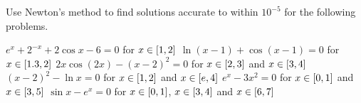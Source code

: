 \documentclass[../../../../Assignments]{subfiles}
\begin{document}
\begin{exercise}\label{exer:2.3.6}
    Use Newton's method to find solutions accurate to within \(10^{-5}\) for the
    following problems.

    \begin{tasks}
        \task \(e^x + 2^{-x} + 2 \cos{x} - 6 = 0\) for \(x \in \interval{1}{2}\)
        \task \(\ln(x - 1) + \cos(x - 1) = 0\) for \(x \in
            \interval{\num{1.3}}{2}\)
        \task \(2 x \cos(2x) - (x - 2)^2 = 0\) for \(x \in \interval{2}{3}\) and
            \(x \in \interval{3}{4}\)
        \task \((x - 2)^2 - \ln{x} = 0\) for \(x \in \interval{1}{2}\) and \(x
            \in \interval{e}{4}\)
        \task \(e^x - 3x^2 = 0\) for \(x \in \interval{0}{1}\) and \(x \in
            \interval{3}{5}\)
        \task \(\sin{x} - e^x = 0\) for \(x \in \interval{0}{1}\), \(x \in
            \interval{3}{4}\) and \(x \in \interval{6}{7}\)
    \end{tasks}
\end{exercise}
\end{document}
